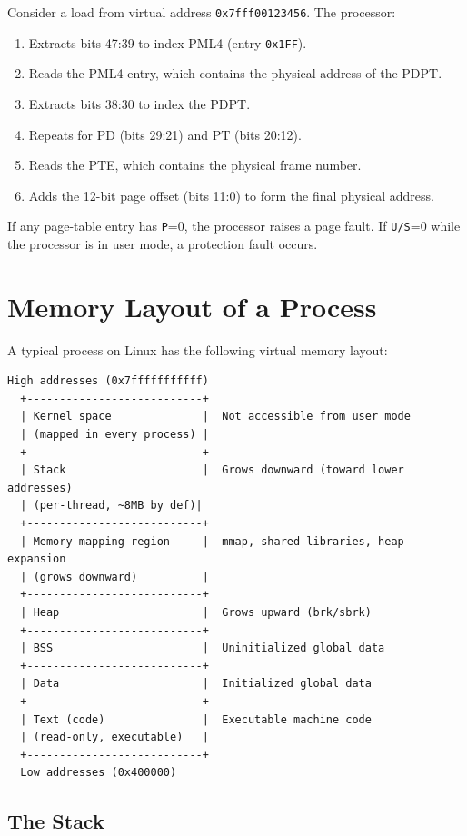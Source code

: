 \begin{example}
	Consider a load from virtual address \texttt{0x7fff00123456}. The processor:
	\begin{enumerate}
		\item Extracts bits 47:39 to index PML4 (entry \texttt{0x1FF}).
		\item Reads the PML4 entry, which contains the physical address of the PDPT.
		\item Extracts bits 38:30 to index the PDPT.
		\item Repeats for PD (bits 29:21) and PT (bits 20:12).
		\item Reads the PTE, which contains the physical frame number.
		\item Adds the 12-bit page offset (bits 11:0) to form the final physical address.
	\end{enumerate}
	If any page-table entry has \texttt{P}=0, the processor raises a page fault. If \texttt{U/S}=0 while the processor is in user mode, a protection fault occurs.
\end{example}

\section{Memory Layout of a Process}

A typical process on Linux has the following virtual memory layout:

\begin{lstlisting}[caption=Linux process memory layout (x86-64)]
  High addresses (0x7fffffffffff)
  +---------------------------+
  | Kernel space              |  Not accessible from user mode
  | (mapped in every process) |
  +---------------------------+
  | Stack                     |  Grows downward (toward lower addresses)
  | (per-thread, ~8MB by def)|
  +---------------------------+
  | Memory mapping region     |  mmap, shared libraries, heap expansion
  | (grows downward)          |
  +---------------------------+
  | Heap                      |  Grows upward (brk/sbrk)
  +---------------------------+
  | BSS                       |  Uninitialized global data
  +---------------------------+
  | Data                      |  Initialized global data
  +---------------------------+
  | Text (code)               |  Executable machine code
  | (read-only, executable)   |
  +---------------------------+
  Low addresses (0x400000)
\end{lstlisting}

\subsection{The Stack}


